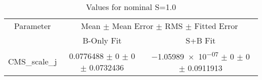 \begin{table}
\centering
\caption{Values for nominal S=1.0}
\begin{tabular}{ccc}
\toprule
Parameter & \multicolumn{2}{c}{Mean $\pm$ Mean Error $\pm$ RMS $\pm$ Fitted Error}\\
 & B-Only Fit & S+B Fit\\
\midrule
CMS\_scale\_j & \num{0.0776488} $\pm$ \num{0} $\pm$ \num{0} $\pm$ \num{0.0732436} & \num{-1.05989e-07} $\pm$ \num{0} $\pm$ \num{0} $\pm$ \num{0.0911913}\\
\bottomrule
\end{tabular}
\end{table}